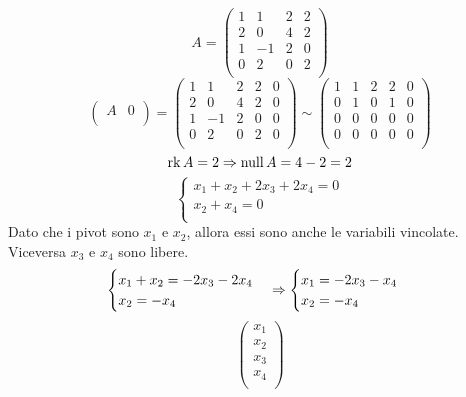 \begin{example}
  $$
    A=
    \begin{pmatrix}
      1 & 1  & 2 & 2 \\
      2 & 0  & 4 & 2 \\
      1 & -1 & 2 & 0 \\
      0 & 2  & 0 & 2 \\
    \end{pmatrix}
  $$
  $$
    \begin{pmatrix}
      A & 0 \\
    \end{pmatrix}
    =
    \begin{pmatrix}
      1 & 1  & 2 & 2 & 0 \\
      2 & 0  & 4 & 2 & 0 \\
      1 & -1 & 2 & 0 & 0 \\
      0 & 2  & 0 & 2 & 0 \\
    \end{pmatrix}
    \sim
    \begin{pmatrix}
      1 & 1 & 2 & 2 & 0 \\
      0 & 1 & 0 & 1 & 0 \\
      0 & 0 & 0 & 0 & 0 \\
      0 & 0 & 0 & 0 & 0 \\
    \end{pmatrix}
  $$
  $$\rk A=2\impl \nul A = 4-2=2$$
  $$
    \begin{cases}
      x_1+x_2+2x_3+2x_4=0 \\
      x_2+x_4=0           \\
    \end{cases}
  $$
  Dato che i pivot sono $x_1$ e $x_2$, allora essi sono anche le variabili vincolate. Viceversa $x_3$ e $x_4$ sono libere.
  $$
    \begin{cases}
      x_1 +x_2=-2x_3-2x_4 \\
      x_2=-x_4            \\
    \end{cases}
    \impl
    \begin{cases}
      x_1=-2x_3-x_4 \\
      x_2=-x_4      \\
    \end{cases}
  $$
  $$
    \begin{pmatrix}
      x_1 \\
      x_2 \\
      x_3 \\
      x_4 \\

\end{pmatrix}$$
\end{example}
